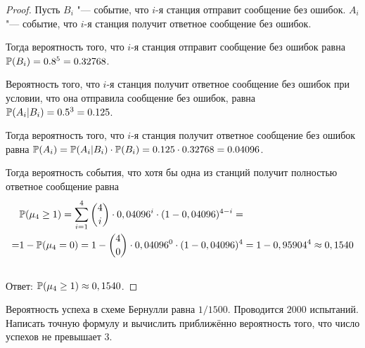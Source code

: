 \begin{proof}
	Пусть \(B_i\) "--- событие, что \(i\)-я станция отправит сообщение без ошибок. \(A_i\) "--- событие, что \(i\)-я станция получит ответное сообщение без ошибок.

	Тогда вероятность того, что \(i\)-я станция отправит сообщение без ошибок равна \(\mathbb P(B_i) = 0.8^5 = 0.32768\).

	Вероятность того, что \(i\)-я станция получит ответное сообщение без ошибок при условии, что она отправила сообщение без ошибок, равна \(\mathbb P(A_i | B_i) = 0.5^3 = 0.125\).

	Тогда вероятность того, что \(i\)-я станция получит ответное сообщение без ошибок равна \(\mathbb P(A_i) = \mathbb P(A_i | B_i) \cdot \mathbb P(B_i) = 0.125 \cdot 0.32768 = 0.04096\).

	Тогда вероятность события, что хотя бы одна из станций получит полностью ответное сообщение равна
	\[
		\begin{aligned}
			  & \mathbb P (\mu_4 \geq 1)
			= \sum_{i=1}^{4} \binom{4}{i}\cdot 0,04096^i \cdot (1-0,04096)^{4-i} =
			\\
			= & 1 - \mathbb P(\mu_4 = 0)  = 1 - \binom{4}{0} \cdot 0,04096^0 \cdot (1-0,04096)^4
			= 1 - 0,95904^4 \approx 0,1540
			\\                                                 \\
		\end{aligned}
	\]
	Ответ: \(\mathbb P (\mu_4 \geq 1) \approx 0,1540\).
\end{proof}

\begin{problem}
Вероятность успеха в схеме Бернулли равна \(1/1500\). Проводится \(2000\) испытаний. Написать точную формулу и вычислить приближённо вероятность того, что число успехов не превышает \(3\).
\end{problem}

